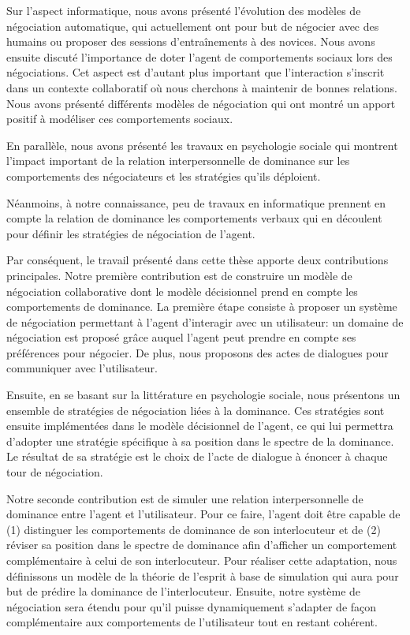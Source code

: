 			Sur l'aspect informatique, nous avons présenté l'évolution des modèles de négociation automatique, qui actuellement ont pour but de négocier avec des humains ou proposer des sessions d'entraînements à des novices. 			 
			Nous avons ensuite discuté l'importance de doter l'agent de comportements sociaux lors des négociations. Cet aspect est d'autant plus important que l'interaction s'inscrit dans un contexte collaboratif où nous cherchons à maintenir de bonnes relations. Nous avons présenté différents modèles de négociation qui ont montré un apport positif à modéliser ces comportements sociaux. 
			
			En parallèle, nous avons présenté les travaux en psychologie sociale qui montrent l'impact important de la relation interpersonnelle de dominance sur les comportements des négociateurs et les stratégies qu'ils déploient.
			
			Néanmoins, à notre connaissance, peu de travaux en informatique prennent en compte la relation de dominance les comportements verbaux qui en découlent pour définir les stratégies de négociation de l'agent.
			
			Par conséquent, le travail présenté dans cette thèse apporte deux contributions principales.
			Notre première contribution est de construire un modèle de négociation collaborative dont le modèle décisionnel prend en compte les comportements de dominance. 
			La première étape consiste à proposer un système de négociation permettant à l'agent d'interagir avec un utilisateur: un domaine de négociation est proposé grâce auquel l'agent peut prendre en compte ses préférences pour négocier. De plus, nous proposons des actes de dialogues pour communiquer avec l'utilisateur.
			
			Ensuite, en se basant sur la littérature en psychologie sociale, nous présentons un ensemble de stratégies de négociation liées à la dominance.
			Ces stratégies sont ensuite implémentées dans le modèle décisionnel de l'agent, ce qui lui permettra d'adopter une stratégie spécifique à sa position dans le spectre de la dominance.  Le résultat de sa stratégie est le choix de l'acte de dialogue à énoncer à chaque tour de négociation.
			
			Notre seconde contribution est de simuler une relation interpersonnelle de dominance entre l'agent et l'utilisateur. Pour ce faire, l'agent doit être capable de (1) distinguer les comportements de dominance de son interlocuteur et  de (2) réviser sa position dans le spectre de dominance afin  d'afficher un comportement complémentaire à celui de son interlocuteur. 
			Pour réaliser cette adaptation, nous définissons un modèle de la théorie de l'esprit à base de simulation qui aura pour but de prédire la dominance de l'interlocuteur. Ensuite, notre système de négociation sera étendu pour qu'il puisse dynamiquement s'adapter de façon complémentaire aux comportements de l'utilisateur tout en restant cohérent. 
		
		
	
	  